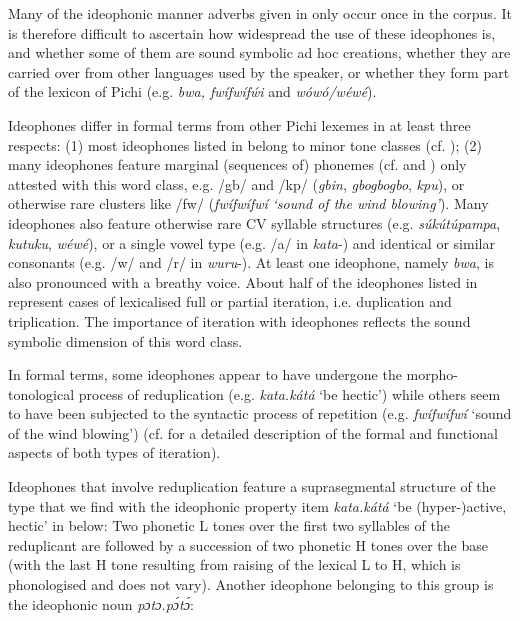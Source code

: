 Many of the ideophonic manner adverbs given in  only occur once in the corpus. It is therefore difficult to ascertain how widespread the use of these ideophones is, and whether some of them are sound symbolic ad hoc creations, whether they are carried over from other languages used by the speaker, or whether they form part of the lexicon of Pichi (e.g. \textit{bwa, fwífwíf\'{w}i} and \textit{wówó/wéwé}).


Ideophones differ in formal terms from other Pichi lexemes in at least three respects: (1) most ideophones listed in  belong to minor tone classes (cf. ); (2) many ideophones feature marginal (sequences of) phonemes (cf.  and ) only attested with this word class, e.g. /gb/ and /kp/ (\textit{gbin}, \textit{gbogbogbo}, \textit{kpu}), or otherwise rare clusters like /fw/ (\textit{fwífwífwí}\textit{ \textup{‘sound of the wind blowing’}}). Many ideophones also feature otherwise rare CV syllable structures (e.g. \textit{súkútúpampa}, \textit{kutuku}, \textit{wéwé}), or a single vowel type (e.g. /a/ in \textit{kata}{}-) and identical or similar consonants (e.g. /w/ and /r/ in \textit{wuru}{}-). At least one ideophone, namely \textit{bwa}, is also  pronounced with a breathy voice. About half of the ideophones listed in  represent cases of lexicalised full or partial iteration, i.e. duplication and triplication. The importance of iteration with ideophones reflects the sound symbolic dimension of this word class. 

In formal terms, some ideophones appear to have undergone the morpho-tonological process of reduplication (e.g. \textit{kata.kátá} ‘be hectic’) while others seem to have been subjected to the syntactic process of repetition (e.g. \textit{fwífwífwí} ‘sound of the wind blowing’) (cf.  for a detailed description of the formal and functional aspects of both types of iteration).

Ideophones that involve reduplication feature a suprasegmental structure of the type that we find with the ideophonic property item \textit{kata.kátá} ‘be (hyper-)active, hectic’ in  below: Two phonetic L tones over the first two syllables of the reduplicant are followed by a succession of two phonetic H tones over the base (with the last H tone resulting from raising of the lexical L to H, which is phonologised and does not vary). Another ideophone belonging to this group is the ideophonic noun \textit{pɔtɔ.pɔ́tɔ́}:


